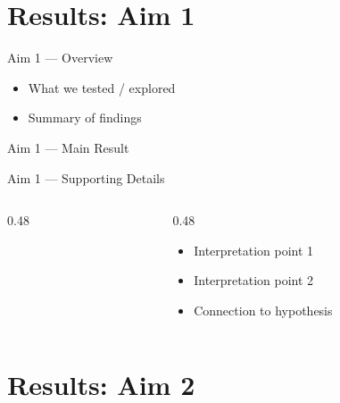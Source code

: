 \documentclass[aspectratio=169,11pt]{beamer}
\begin{document}
\section{Results: Aim 1}

\begin{frame}{Aim 1 — Overview}
  \begin{itemize}
    \item What we tested / explored
    \item Summary of findings
  \end{itemize}
\end{frame}

\begin{frame}{Aim 1 — Main Result}
  \begin{center}
  \end{center}
\end{frame}

\begin{frame}{Aim 1 — Supporting Details}
  \begin{columns}[T]
    \begin{column}{0.48\textwidth}
    \end{column}
    \begin{column}{0.48\textwidth}
      \begin{itemize}
        \item Interpretation point 1
        \item Interpretation point 2
        \item Connection to hypothesis
      \end{itemize}
    \end{column}
  \end{columns}
\end{frame}

\section{Results: Aim 2}
\end{document}
